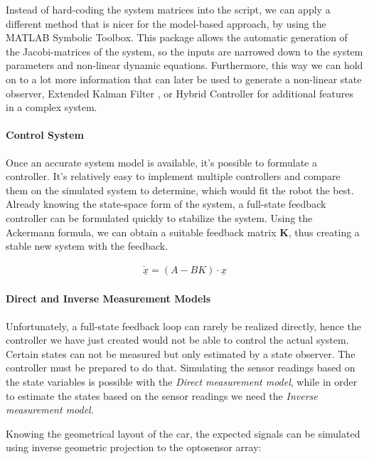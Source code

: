 Instead of hard-coding the system matrices into the script, we can apply a different method that is nicer for the model-based approach, by using the \textsf{MATLAB} \textsf{Symbolic} \textsf{Toolbox}. This package allows the automatic generation of the Jacobi-matrices of the system, so the inputs are narrowed down to the system parameters and non-linear dynamic equations.
Furthermore, this way we can hold on to a lot more information that can later be used to generate a non-linear state observer, Extended Kalman Filter \cite{ekf}, or Hybrid Controller \cite{hybrid} for additional features in a complex system.
     
\paragraph{Control System}

Once an accurate system model is available, it's possible to formulate a controller. It's relatively easy to implement multiple controllers and compare them on the simulated system to determine, which would fit the robot the best.
Already knowing the state-space form of the system, a full-state feedback controller can be formulated quickly to stabilize the system. Using the Ackermann formula, we can obtain a suitable feedback matrix \textbf{K}, thus creating a stable new system with the feedback.

\begin{align}
	\underline{\dot{x}} = (A - BK) \cdot \underline{x}
\end{align}

\paragraph{Direct and Inverse Measurement Models}

Unfortunately, a full-state feedback loop can rarely be realized directly, hence the controller we have just created would not be able to control the actual system. Certain states can not be measured but only estimated by a state observer. The controller must be prepared to do that. Simulating the sensor readings based on the state variables is possible with the \emph{Direct measurement model}, while in order to estimate the states based on the sensor readings we need the \emph{Inverse measurement model}.

Knowing the geometrical layout of the car, the expected signals can be simulated using inverse geometric projection to the optosensor array:

